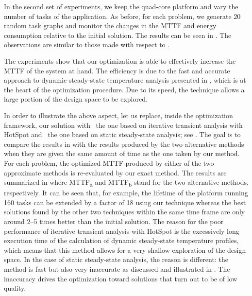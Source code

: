 In the second set of experiments, we keep the quad-core platform and vary the
number of tasks \nt of the application. As before, for each problem, we generate
20 random task graphs and monitor the changes in the \ac{MTTF} and energy
consumption relative to the initial solution. The results can be seen in
. The observations are similar to those made with
respect to .

The experiments show that our optimization is able to effectively increase the
\ac{MTTF} of the system at hand. The efficiency is due to the fast and accurate
approach to dynamic steady-state temperature analysis presented in
, which is at the heart of the optimization
procedure. Due to its speed, the technique allows a large portion of the design
space to be explored.

In order to illustrate the above aspect, let us replace, inside the optimization
framework, our solution with \one~the one based on iterative transient analysis
with HotSpot and \two~the one based on static steady-state analysis; see
. The goal is to compare the results in
 with the results produced by the two alternative
methods when they are given the same amount of time as the one taken by our
method. For each problem, the optimized \ac{MTTF} produced by either of the two
approximate methods is re-evaluated by our exact method. The results are
summarized in  where
\ac{MTTF}\textsubscript{a} and \ac{MTTF}\textsubscript{b} stand for the two
alternative methods, respectively. It can be seen that, for example, the
lifetime of the platform running 160 tasks can be extended by a factor of 18
using our technique whereas the best solutions found by the other two techniques
within the same time frame are only around 2--5 times better than the initial
solution. The reason for the poor performance of iterative transient analysis
with HotSpot is the excessively long execution time of the calculation of
dynamic steady-state temperature profiles, which means that this method allows
for a very shallow exploration of the design space. In the case of static
steady-state analysis, the reason is different: the method is fast but also very
inaccurate as discussed and illustrated in . The
inaccuracy drives the optimization toward solutions that turn out to be of low
quality.

